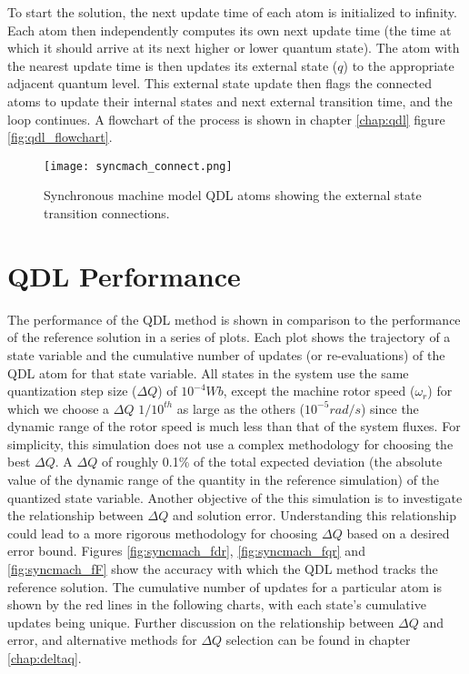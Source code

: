To start the solution, the next update time of each atom is initialized to infinity. Each atom then independently computes its own next update time (the time at which it should arrive at its next higher or lower quantum state). The atom with the nearest update time is then updates its external state ($q$) to the appropriate adjacent quantum level. This external state update then flags the connected atoms to update their internal states and next external transition time, and the loop continues. A flowchart of the process is shown in chapter \ref{chap:qdl} figure \ref{fig:qdl_flowchart}.

\begin{figure}[h]
    \centering
    \texttt{[image: syncmach\_connect.png]}
    \caption{Synchronous machine model QDL atoms showing the external state transition connections.}
    \label{fig:syncmach_connect}
\end{figure}

\section{QDL Performance}

The performance of the QDL method is shown in comparison to the performance of the reference solution in a series of plots. Each plot shows the trajectory of a state variable and the cumulative number of updates (or re-evaluations) of the QDL atom for that state variable. All states in the system use the same quantization step size ($\Delta Q$) of $10^{-4} Wb$, except the machine rotor speed ($\omega_r$) for which we choose a $\Delta Q$ $1/10^{th}$ as large as the others ($10^{-5} rad/s$) since the dynamic range of the rotor speed is much less than that of the system fluxes. For simplicity, this simulation does not use a complex methodology for choosing the best $\Delta Q$. A $\Delta Q$ of roughly 0.1\% of the total expected deviation (the absolute value of the dynamic range of the quantity in the reference simulation) of the quantized state variable. Another objective of the this simulation is to investigate the relationship between $\Delta Q$ and solution error. Understanding this relationship could lead to a more rigorous methodology for choosing $\Delta Q$ based on a desired error bound. Figures \ref{fig:syncmach_fdr}, \ref{fig:syncmach_fqr} and \ref{fig:syncmach_fF} show the accuracy with which the QDL method tracks the reference solution. The cumulative number of updates for a particular atom is shown by the red lines in the following charts, with each state's cumulative updates being unique. Further discussion on the relationship between $\Delta Q$ and error, and alternative methods for $\Delta Q$ selection can be found in chapter \ref{chap:deltaq}.

